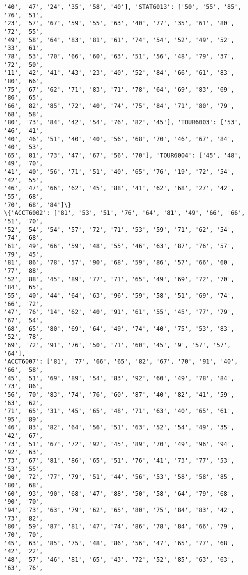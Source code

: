 \documentclass[11pt]{article}
\begin{document}
\begin{Verbatim}[commandchars=\\\{\}]
'40', '47', '24', '35', '58', '40'], 'STAT6013': ['50', '55', '85', '76', '51',
'23', '57', '67', '59', '55', '63', '40', '77', '35', '61', '80', '72', '55',
'49', '58', '64', '83', '81', '61', '74', '54', '52', '49', '52', '33', '61',
'78', '53', '70', '66', '60', '63', '51', '56', '48', '79', '37', '72', '50',
'11', '42', '41', '43', '23', '40', '52', '84', '66', '61', '83', '80', '66',
'75', '67', '62', '71', '83', '71', '78', '64', '69', '83', '69', '86', '65',
'66', '82', '85', '72', '40', '74', '75', '84', '71', '80', '79', '68', '58',
'80', '73', '84', '42', '54', '76', '82', '45'], 'TOUR6003': ['53', '46', '41',
'40', '46', '51', '40', '40', '56', '68', '70', '46', '67', '84', '40', '53',
'65', '81', '73', '47', '67', '56', '70'], 'TOUR6004': ['45', '48', '49', '70',
'41', '40', '56', '71', '51', '40', '65', '76', '19', '72', '54', '42', '55',
'46', '47', '66', '62', '45', '88', '41', '62', '68', '27', '42', '55', '68',
'70', '68', '84']\}
\{'ACCT6002': ['81', '53', '51', '76', '64', '81', '49', '66', '66', '51', '70',
'52', '54', '54', '57', '72', '71', '53', '59', '71', '62', '54', '74', '68',
'61', '49', '66', '59', '48', '55', '46', '63', '87', '76', '57', '79', '45',
'81', '86', '78', '57', '90', '68', '59', '86', '57', '66', '60', '77', '88',
'52', '88', '45', '89', '77', '71', '65', '49', '69', '72', '70', '84', '65',
'55', '40', '44', '64', '63', '96', '59', '58', '51', '69', '74', '66', '72',
'47', '76', '14', '62', '40', '91', '61', '55', '45', '77', '79', '67', '54',
'68', '65', '80', '69', '64', '49', '74', '40', '75', '53', '83', '52', '78',
'69', '72', '91', '76', '50', '71', '60', '45', '9', '57', '57', '64'],
'ACCT6007': ['81', '77', '66', '65', '82', '67', '70', '91', '40', '66', '58',
'45', '51', '69', '89', '54', '83', '92', '60', '49', '78', '84', '73', '86',
'56', '70', '83', '74', '76', '60', '87', '40', '82', '41', '59', '63', '62',
'71', '65', '31', '45', '65', '48', '71', '63', '40', '65', '61', '95', '89',
'46', '83', '82', '64', '56', '51', '63', '52', '54', '49', '35', '42', '67',
'73', '51', '67', '72', '92', '45', '89', '70', '49', '96', '94', '92', '63',
'73', '67', '81', '86', '65', '51', '76', '41', '73', '77', '53', '53', '55',
'90', '72', '77', '79', '51', '44', '56', '53', '58', '58', '85', '80', '68',
'60', '93', '90', '68', '47', '88', '50', '58', '64', '79', '68', '90', '70',
'94', '73', '63', '79', '62', '65', '80', '75', '84', '83', '42', '73', '82',
'80', '59', '87', '81', '47', '74', '86', '78', '84', '66', '79', '70', '70',
'45', '63', '85', '75', '48', '86', '56', '47', '65', '77', '68', '42', '22',
'48', '57', '46', '81', '65', '43', '72', '52', '85', '63', '63', '63', '76',

\end{Verbatim}
\end{document}
